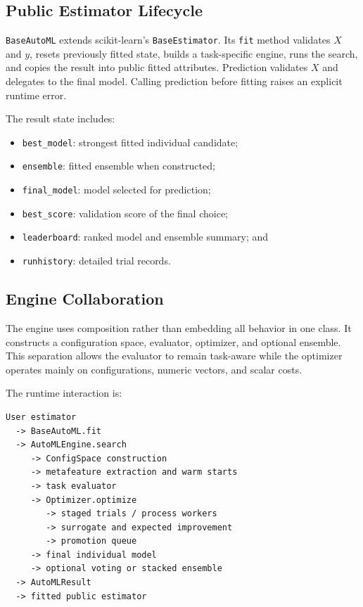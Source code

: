 \documentclass[12pt,a4paper,oneside]{report}
\begin{document}
\subsection{Public Estimator Lifecycle}

\texttt{BaseAutoML} extends scikit-learn's \texttt{BaseEstimator}. Its
\texttt{fit} method validates $X$ and $y$, resets previously fitted state,
builds a task-specific engine, runs the search, and copies the result into
public fitted attributes. Prediction validates $X$ and delegates to the final
model. Calling prediction before fitting raises an explicit runtime error.

\medskip

\noindent The result state includes:

\begin{itemize}[leftmargin=*]
  \item \texttt{best\_model}: strongest fitted individual candidate;
  \item \texttt{ensemble}: fitted ensemble when constructed;
  \item \texttt{final\_model}: model selected for prediction;
  \item \texttt{best\_score}: validation score of the final choice;
  \item \texttt{leaderboard}: ranked model and ensemble summary; and
  \item \texttt{runhistory}: detailed trial records.
\end{itemize}

\subsection{Engine Collaboration}

The engine uses composition rather than embedding all behavior in one class.
It constructs a configuration space, evaluator, optimizer, and optional
ensemble. This separation allows the evaluator to remain task-aware while the
optimizer operates mainly on configurations, numeric vectors, and scalar costs.

\medskip

\noindent The runtime interaction is:

\begin{verbatim}
User estimator
  -> BaseAutoML.fit
  -> AutoMLEngine.search
     -> ConfigSpace construction
     -> metafeature extraction and warm starts
     -> task evaluator
     -> Optimizer.optimize
        -> staged trials / process workers
        -> surrogate and expected improvement
        -> promotion queue
     -> final individual model
     -> optional voting or stacked ensemble
  -> AutoMLResult
  -> fitted public estimator
\end{verbatim}
\end{document}
